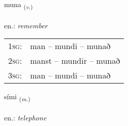 \documentclass[frontgrid, backgrid]{flacards}\usepackage[]{graphicx}\usepackage[]{xcolor}
\begin{document}
\renewcommand{\flhead}{\vskip5pt \fboxsep=0pt {\small\bfseries\footnotesize Sagnorð | Verb}}
\renewcommand{\fcfoot}{\vskip5pt \fboxsep=0pt \hspace{2pt}{\small\bfseries\footnotesize 1K}}

\renewcommand{\blhead}{\vskip5pt {\small\bfseries\footnotesize Sagnorð | Verb }}
\renewcommand{\bcfoot}{\vskip5pt \hspace{2pt}{\small\bfseries\footnotesize 1K}}


{muna \small{\textsubscript{(\textit{v.})}} \\[1ex] %
\textphonetic{[mʏːna]} \\
en.: \emph{remember} \\  [2ex]
\renewcommand*{\arraystretch}{0.8}
\begin{tabular}{p{1cm}l}
\textsc{1sg}: & man -- mundi -- munað \\ 
\textsc{2sg}: & manst -- mundir -- munað \\ 
\textsc{3sg}: & man -- mundi -- munað \\ 
\end{tabular}
}

\renewcommand{\flhead}{\vskip5pt \fboxsep=0pt {\small\bfseries\footnotesize Nafnorð | Noun}}
\renewcommand{\fcfoot}{\vskip5pt \fboxsep=0pt \hspace{2pt}{\small\bfseries\footnotesize 1K}}

\renewcommand{\blhead}{\vskip5pt {\small\bfseries\footnotesize Nafnorð | Noun }}
\renewcommand{\bcfoot}{\vskip5pt \hspace{2pt}{\small\bfseries\footnotesize 1K}}


{sími \small{\textsubscript{(\textit{m.})}} \\[1ex] %
\textphonetic{[siːmɪ]} \\
en.: \emph{telephone} \\  [2ex]
\renewcommand*{\arraystretch}{0.8}
}
\end{document}
